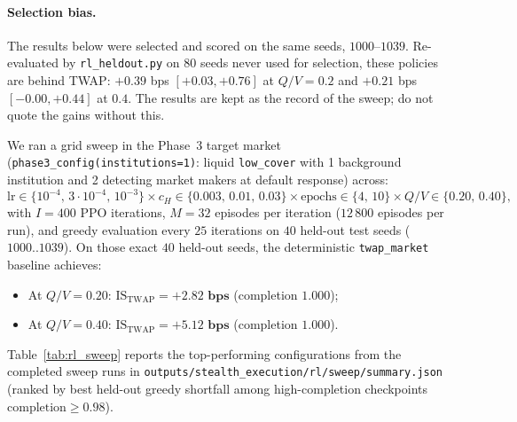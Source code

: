 \documentclass[11pt,a4paper]{article}
\newcommand{\code}[1]{\texttt{#1}}
\begin{document}
\paragraph{Selection bias.} The results below were selected and scored on the same seeds, $1000$--$1039$. Re-evaluated by \code{rl\_heldout.py} on 80 seeds never used for selection, these policies are behind TWAP: $+0.39$ bps $[+0.03, +0.76]$ at $Q/V = 0.2$ and $+0.21$ bps $[-0.00, +0.44]$ at $0.4$. The results are kept as the record of the sweep; do not quote the gains without this.


We ran a grid sweep in the Phase~3 target market (\code{phase3\_config(institutions=1)}: liquid
\code{low\_cover} with 1 background institution and 2 detecting market makers at default response) across:
\[
  \text{lr} \in \{10^{-4},\, 3\cdot 10^{-4},\, 10^{-3}\} \times
  c_H \in \{0.003,\, 0.01,\, 0.03\} \times
  \text{epochs} \in \{4,\, 10\} \times
  Q/V \in \{0.20,\, 0.40\},
\]
with $I = 400$ PPO iterations, $M = 32$ episodes per iteration ($12\,800$ episodes per run), and greedy
evaluation every $25$ iterations on $40$ held-out test seeds ($1000..1039$). On those exact $40$ held-out
seeds, the deterministic \code{twap\_market} baseline achieves:
\begin{itemize}[nosep]
\item At $Q/V = 0.20$: $\text{IS}_{\text{TWAP}} = \mathbf{+2.82\text{ bps}}$ (completion $1.000$);
\item At $Q/V = 0.40$: $\text{IS}_{\text{TWAP}} = \mathbf{+5.12\text{ bps}}$ (completion $1.000$).
\end{itemize}

Table~\ref{tab:rl_sweep} reports the top-performing configurations from the completed sweep runs in
\code{outputs/stealth\_execution/rl/sweep/summary.json} (ranked by best held-out greedy shortfall among high-completion
checkpoints $\text{completion} \ge 0.98$).
\end{document}
